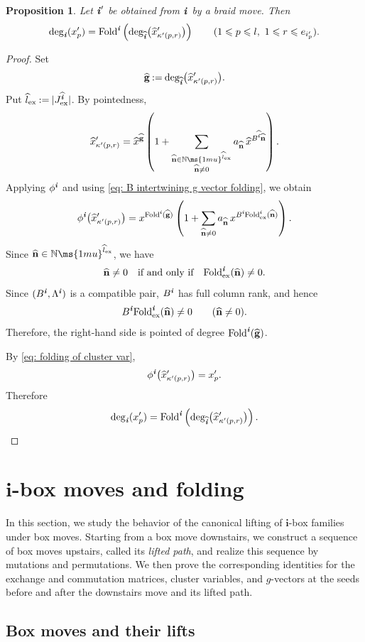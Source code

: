 \documentclass[12pt, leqno]{amsart}
\numberwithin{equation}{section}
\theoremstyle{plain}
\newtheorem{proposition}[lemma]{Proposition}
\theoremstyle{definition}
\renewcommand{\le}{\leqslant}
\newcommand{\seteq}{\mathbin{:=}}
\newcommand{\ex}{\mathrm{ex}}
\newcommand{\N}{\mathbb{N}\ms{1mu}}
\newcommand{\Fold}{{\rm Fold}}
\newcommand{\ii}{ \textbf{\textit{i}}}
\newcommand{\hl}{\widehat{l}}
\newcommand{\hx}{\widehat{x}}
\newcommand{\hii}{{\widehat{\ii}}}
\newcommand{\hbfn}{\widehat{\bfn}}
\newcommand{\hbfg}{\widehat{\bfg}}
\newcommand{\bfg}{\mathbf{g}}
\newcommand{\bfi}{\mathbf{i}}
\newcommand{\bfn}{\mathbf{n}}
\begin{document}
\begin{proposition}\label{prop: g vector folding}
Let $\ii'$ be obtained from $\ii$ by a braid move. Then
\[
\deg_\ii(x'_p) = \Fold^\ii \left( \deg_\hii\bigl(\hx'_{\kappa'(p,r)}\bigr) \right) \qquad (1\le p\le l,\ 1\le r\le e_{i'_p}).
\]
\end{proposition}

\begin{proof}
Set
\[
\hbfg \seteq \deg_\hii\bigl(\hx'_{\kappa'(p,r)}\bigr).
\]
Put $\hl_{\rm ex}\seteq|J^\hii_{\ex}|$.
By pointedness,
\[
\hx'_{\kappa'(p,r)} = \hx^{\hbfg} \left( 1+ \sum_{\substack{ \hbfn\in\N^{\hl_{\rm ex}}\\  \hbfn\ne0}} a_{\hbfn}\, \hx^{B^\hii\hbfn} \right).
\]
Applying $\phi^\ii$ and using
\eqref{eq: B intertwining g vector folding}, we obtain
\[
\phi^\ii\bigl(\hx'_{\kappa'(p,r)}\bigr) = x^{\Fold^\ii(\hbfg)}
\left( 1+ \sum_{\hbfn\ne0} a_{\hbfn}\, x^{B^\ii\Fold^\ii_{\rm ex}(\hbfn)} \right).
\]
Since $\hbfn\in\N^{\hl_{\rm ex}}$, we have
\[
\hbfn\ne0 \quad\text{if and only if}\quad \Fold^\ii_{\rm ex}(\hbfn)\ne0.
\]
Since $(B^\ii,\Lambda^\ii)$ is a compatible pair, $B^\ii$ has full column rank, and hence
\[
B^\ii\Fold^\ii_{\rm ex}(\hbfn)\ne0
\qquad(\hbfn\ne0).
\]
Therefore, the right-hand side is pointed of degree
$\Fold^\ii(\hbfg)$.

By \eqref{eq: folding of cluster var},
\[
\phi^\ii\bigl(\hx'_{\kappa'(p,r)}\bigr)=x'_p.
\]
Therefore
\[
\deg_\ii(x'_p) = \Fold^\ii \left( \deg_\hii\bigl(\hx'_{\kappa'(p,r)}\bigr) \right). \qedhere
\]
\end{proof}

\section{$\bfi$-box moves and folding} \label{sec: box}

In this section, we study the behavior of the canonical lifting of
$\bfi$-box families under box moves.  Starting from a box move downstairs, we construct a sequence of box moves upstairs, called its \emph{lifted path}, and realize this sequence by mutations and permutations.   We then prove the corresponding identities for the exchange and commutation matrices, cluster variables, and $g$-vectors at the seeds before and after the downstairs move and its lifted path. \par
\subsection{Box moves and their lifts}
\end{document}
